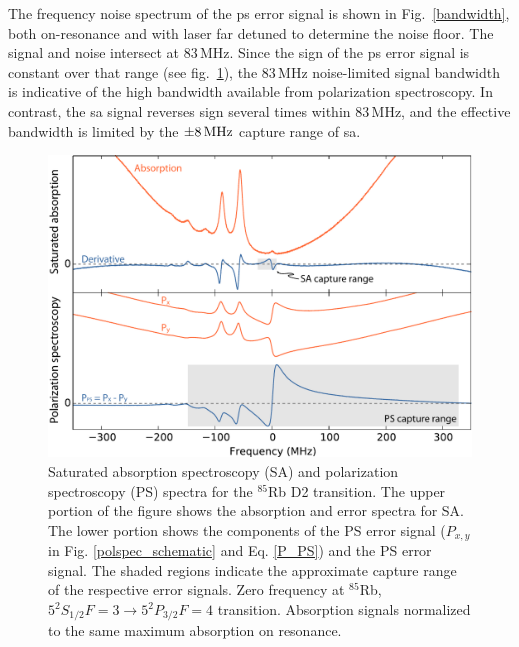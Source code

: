 The frequency noise spectrum of the \gls*{ps} error signal is shown in  Fig.~\ref{bandwidth}, both on-resonance and with laser far detuned to determine the noise floor.  The signal and noise intersect at 83\,MHz.
Since the sign of the \gls*{ps} error signal is constant over that range (see fig.~\ref{sa_ps_spectra}), the 83\,MHz noise-limited signal bandwidth is indicative of the high bandwidth available from polarization spectroscopy.
In contrast, the \gls*{sa} signal reverses sign several times within 83\,MHz, and the effective bandwidth is limited by the $\pm 8\rm\,MHz$ capture range of \gls*{sa}.

\begin{figure}[htbp]
    \centering
    \includegraphics[width=\linewidth]{chapter1/Figs/fig2_v1.pdf}
    \caption{Saturated absorption spectroscopy (SA) and polarization spectroscopy (PS) spectra for the $^{85}$Rb D2 transition.
The upper portion of the figure shows the absorption and error spectra for SA.
The lower portion shows the components of the PS error signal ($P_{x,y}$ in Fig. \ref{polspec_schematic} and Eq. \ref{P_PS}) and the PS error signal.
The shaded regions indicate the approximate capture range of the respective error signals.
Zero frequency at $^{85}$Rb, $5^2S_{1/2} F=3\rightarrow5^2P_{3/2} F=4$ transition.
Absorption signals normalized to the same maximum absorption on resonance.}
    \label{sa_ps_spectra}
\end{figure}

